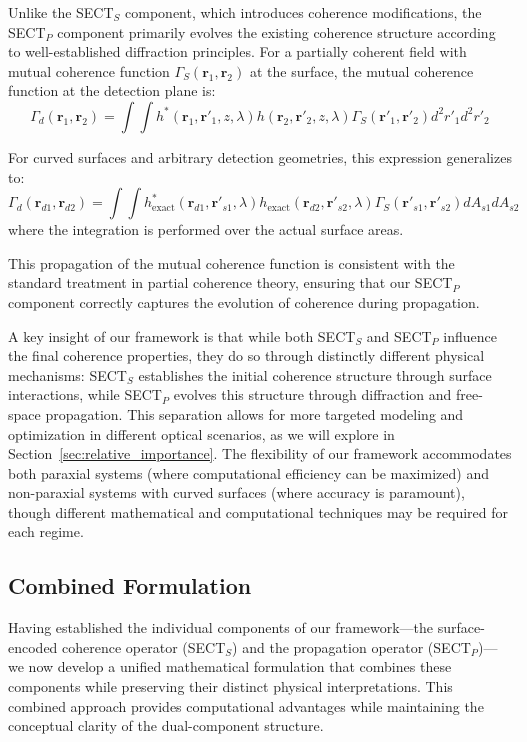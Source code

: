 \documentclass[a4paper,12pt]{article}
\begin{document}
Unlike the SECT$_S$ component, which introduces coherence modifications, the SECT$_P$ component primarily evolves the 
existing coherence structure according to well-established diffraction principles. For a partially coherent 
field with mutual coherence function $\Gamma_S(\bm{r}_1, \bm{r}_2)$ at the surface, the mutual coherence function 
at the detection plane is:
\begin{equation}
\Gamma_d(\bm{r}_1, \bm{r}_2) = \int\int h^*(\bm{r}_1, \bm{r}'_1, z, \lambda) h(\bm{r}_2, \bm{r}'_2, z, \lambda) \Gamma_S(\bm{r}'_1, \bm{r}'_2) d^2r'_1 d^2r'_2
\end{equation}

For curved surfaces and arbitrary detection geometries, this expression generalizes to:
\begin{equation}
\Gamma_d(\bm{r}_{d1}, \bm{r}_{d2}) = \int\int h_{\text{exact}}^*(\bm{r}_{d1}, \bm{r}'_{s1}, \lambda) h_{\text{exact}}(\bm{r}_{d2}, \bm{r}'_{s2}, \lambda) \Gamma_S(\bm{r}'_{s1}, \bm{r}'_{s2}) dA_{s1} dA_{s2}
\end{equation}
where the integration is performed over the actual surface areas.

This propagation of the mutual coherence function is consistent with the standard treatment in partial coherence theory, 
ensuring that our SECT$_P$ component correctly captures the evolution of coherence during propagation.

A key insight of our framework is that while both SECT$_S$ and SECT$_P$ influence the final coherence properties, 
they do so through distinctly different physical mechanisms: SECT$_S$ establishes the initial coherence structure 
through surface interactions, while SECT$_P$ evolves this structure through diffraction and free-space propagation. 
This separation allows for more targeted modeling and optimization in different optical scenarios, as we will explore 
in Section~\ref{sec:relative_importance}. The flexibility of our framework accommodates both paraxial systems (where 
computational efficiency can 
be maximized) and non-paraxial systems with curved surfaces (where accuracy is paramount), though different mathematical 
and computational techniques may be required for each regime.

\subsection{Combined Formulation}

Having established the individual components of our framework—the surface-encoded coherence operator (SECT$_S$) and the propagation operator (SECT$_P$)—we now develop a unified mathematical formulation that combines these components while preserving their distinct physical interpretations. This combined approach provides computational advantages while maintaining the conceptual clarity of the dual-component structure.
\end{document}
